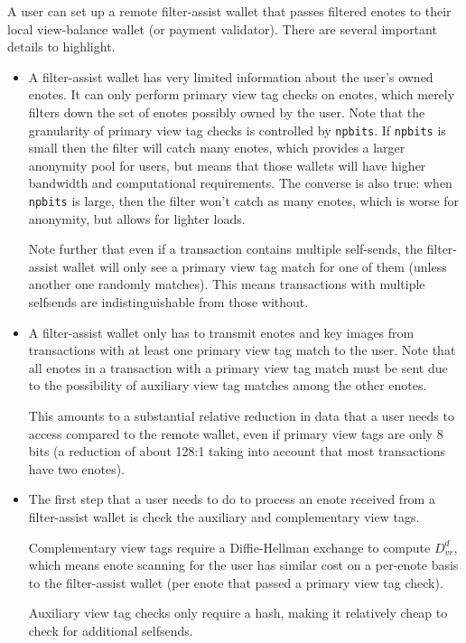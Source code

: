 A user can set up a remote filter-assist wallet that passes filtered enotes to their local view-balance wallet (or payment validator). There are several important details to highlight.
\begin{itemize}
    \item A filter-assist wallet has very limited information about the user's owned enotes. It can only perform primary view tag checks on enotes, which merely filters down the set of enotes possibly owned by the user. Note that the granularity of primary view tag checks is controlled by {\tt npbits}. If {\tt npbits} is small then the filter will catch many enotes, which provides a larger anonymity pool for users, but means that those wallets will have higher bandwidth and computational requirements. The converse is also true: when {\tt npbits} is large, then the filter won't catch as many enotes, which is worse for anonymity, but allows for lighter loads.

    Note further that even if a transaction contains multiple self-sends, the filter-assist wallet will only see a primary view tag match for one of them (unless another one randomly matches). This means transactions with multiple selfsends are indistinguishable from those without.

    \item A filter-assist wallet only has to transmit enotes and key images from transactions with at least one primary view tag match to the user. Note that all enotes in a transaction with a primary view tag match must be sent due to the possibility of auxiliary view tag matches among the other enotes.

    This amounts to a substantial relative reduction in data that a user needs to access compared to the remote wallet, even if primary view tags are only 8 bits (a reduction of about 128:1 taking into account that most transactions have two enotes).

    \item The first step that a user needs to do to process an enote received from a filter-assist wallet is check the auxiliary and complementary view tags.
    
    Complementary view tags require a Diffie-Hellman exchange to compute $D^d_{vr}$, which means enote scanning for the user has similar cost on a per-enote basis to the filter-assist wallet (per enote that passed a primary view tag check).

    Auxiliary view tag checks only require a hash, making it relatively cheap to check for additional selfsends.
\end{itemize}

